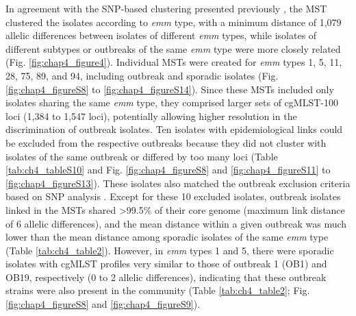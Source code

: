 In agreement with the \ac{SNP}-based clustering presented previously \cite{coelho_genomic_2019}, the \ac{MST} clustered the isolates according to \textit{emm} type, with a minimum distance of 1,079 allelic differences between isolates of different \textit{emm} types, while isolates of different subtypes or outbreaks of the same \textit{emm} type were more closely related (Fig. \ref{fig:chap4_figure4}). Individual \ac{MST}s were created for \textit{emm} types 1, 5, 11, 28, 75, 89, and 94, including outbreak and sporadic isolates (Fig. \ref{fig:chap4_figureS8} to \ref{fig:chap4_figureS14}). Since these \ac{MST}s included only isolates sharing the same \textit{emm} type, they comprised larger sets of cgMLST-100 loci (1,384 to 1,547 loci), potentially allowing higher resolution in the discrimination of outbreak isolates. Ten isolates with epidemiological links could be excluded from the respective outbreaks because they did not cluster with isolates of the same outbreak or differed by too many loci (Table \ref{tab:ch4_tableS10} and Fig. \ref{fig:chap4_figureS8} and \ref{fig:chap4_figureS11} to \ref{fig:chap4_figureS13}). These isolates also matched the outbreak exclusion criteria based on \ac{SNP} analysis \cite{coelho_genomic_2019}. Except for these 10 excluded isolates, outbreak isolates linked in the \ac{MST}s shared >99.5\% of their core genome (maximum link distance of 6 allelic differences), and the mean distance within a given outbreak was much lower than the mean distance among sporadic isolates of the same \textit{emm} type (Table \ref{tab:ch4_table2}). However, in \textit{emm} types 1 and 5, there were sporadic isolates with \ac{cgMLST} profiles very similar to those of outbreak 1 (OB1) and OB19, respectively (0 to 2 allelic differences), indicating that these outbreak strains were also present in the community (Table \ref{tab:ch4_table2}; Fig. \ref{fig:chap4_figureS8} and \ref{fig:chap4_figureS9}).

